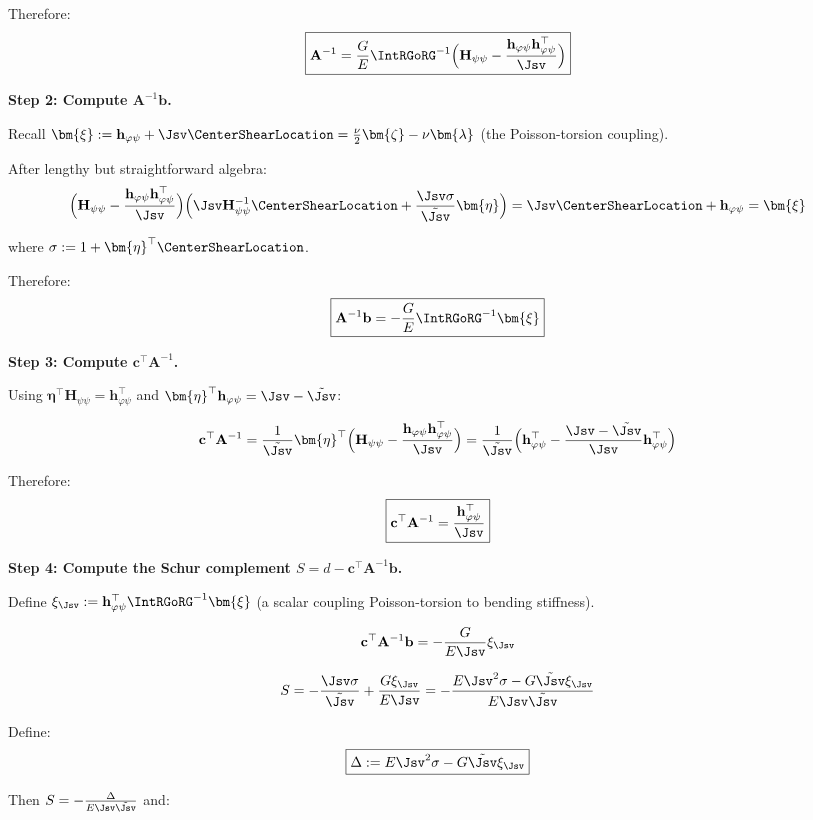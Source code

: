 Therefore:
\[\boxed{\mathbf{A}^{-1} = \frac{G}{E}\IntRGoRG^{-1}\Big(\mathbf{H}_{\psi\psi} - \frac{\mathbf{h}_{\varphi\psi}\mathbf{h}_{\varphi\psi}^\top}{\Jsv}\Big)}\]

\textbf{Step 2: Compute \(\mathbf{A}^{-1}\mathbf{b}\).}

Recall
\(\bm{\xi} := \mathbf{h}_{\varphi\psi} + \Jsv\CenterShearLocation = \frac{\nu}{2}\bm{\zeta} - \nu\bm{\lambda}\)
(the Poisson-torsion coupling).

After lengthy but straightforward algebra:
\[\Big(\mathbf{H}_{\psi\psi} - \frac{\mathbf{h}_{\varphi\psi}\mathbf{h}_{\varphi\psi}^\top}{\Jsv}\Big)\Big(\Jsv\mathbf{H}_{\psi\psi}^{-1}\CenterShearLocation + \frac{\Jsv\sigma}{\tilde{\Jsv}}\bm{\eta}\Big) = \Jsv\CenterShearLocation + \mathbf{h}_{\varphi\psi} = \bm{\xi}\]

where \(\sigma := 1 + \bm{\eta}^\top\CenterShearLocation\).

Therefore:
\[\boxed{\mathbf{A}^{-1}\mathbf{b} = -\frac{G}{E}\IntRGoRG^{-1}\bm{\xi}}\]

\textbf{Step 3: Compute \(\mathbf{c}^\top\mathbf{A}^{-1}\).}

Using
\(\bm{\eta}^\top\mathbf{H}_{\psi\psi} = \mathbf{h}_{\varphi\psi}^\top\)
and \(\bm{\eta}^\top\mathbf{h}_{\varphi\psi} = \Jsv - \tilde{\Jsv}\):

\[\mathbf{c}^\top\mathbf{A}^{-1} = \frac{1}{\tilde{\Jsv}}\bm{\eta}^\top\Big(\mathbf{H}_{\psi\psi} - \frac{\mathbf{h}_{\varphi\psi}\mathbf{h}_{\varphi\psi}^\top}{\Jsv}\Big) = \frac{1}{\tilde{\Jsv}}\Big(\mathbf{h}_{\varphi\psi}^\top - \frac{\Jsv - \tilde{\Jsv}}{\Jsv}\mathbf{h}_{\varphi\psi}^\top\Big)\]

Therefore:
\[\boxed{\mathbf{c}^\top\mathbf{A}^{-1} = \frac{\mathbf{h}_{\varphi\psi}^\top}{\Jsv}}\]

\textbf{Step 4: Compute the Schur complement
\(S = d - \mathbf{c}^\top\mathbf{A}^{-1}\mathbf{b}\).}

Define
\(\xi_{\Jsv} := \mathbf{h}_{\varphi\psi}^\top\IntRGoRG^{-1}\bm{\xi}\)  
(a
scalar coupling Poisson-torsion to bending stiffness).

\[\mathbf{c}^\top\mathbf{A}^{-1}\mathbf{b} = -\frac{G}{E\Jsv}\xi_{\Jsv}\]

\[S = -\frac{\Jsv\sigma}{\tilde{\Jsv}} + \frac{G\xi_{\Jsv}}{E\Jsv} = -\frac{E\Jsv^2\sigma - G\tilde{\Jsv}\xi_{\Jsv}}{E\Jsv\tilde{\Jsv}}\]

Define: \[\boxed{\Delta := E\Jsv^2\sigma - G\tilde{\Jsv}\xi_{\Jsv}}\]

Then \(S = -\frac{\Delta}{E\Jsv\tilde{\Jsv}}\) and:

